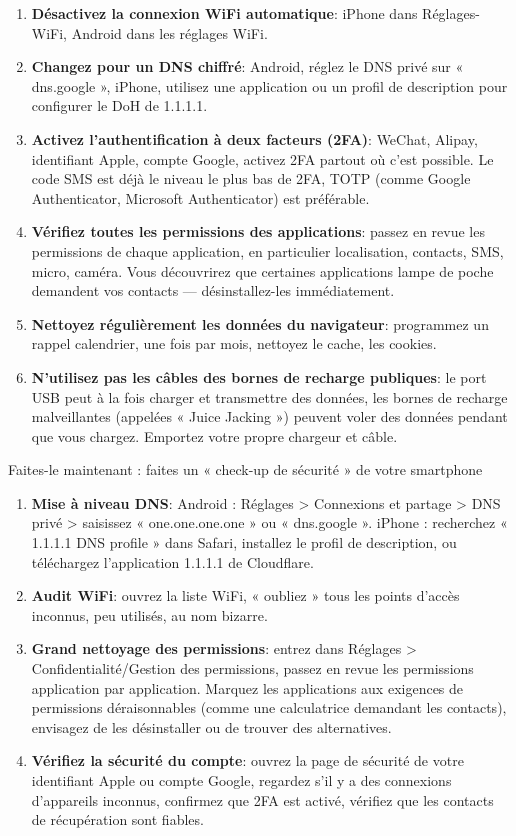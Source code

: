 \begin{enumerate}
  \item \textbf{Désactivez la connexion WiFi automatique}: iPhone dans Réglages-WiFi, Android dans les réglages WiFi.
  \item \textbf{Changez pour un DNS chiffré}: Android, réglez le DNS privé sur « dns.google », iPhone, utilisez une application ou un profil de description pour configurer le DoH de 1.1.1.1.
  \item \textbf{Activez l'authentification à deux facteurs (2FA)}: WeChat, Alipay, identifiant Apple, compte Google, activez 2FA partout où c'est possible. Le code SMS est déjà le niveau le plus bas de 2FA, TOTP (comme Google Authenticator, Microsoft Authenticator) est préférable.
  \item \textbf{Vérifiez toutes les permissions des applications}: passez en revue les permissions de chaque application, en particulier localisation, contacts, SMS, micro, caméra. Vous découvrirez que certaines applications lampe de poche demandent vos contacts — désinstallez-les immédiatement.
  \item \textbf{Nettoyez régulièrement les données du navigateur}: programmez un rappel calendrier, une fois par mois, nettoyez le cache, les cookies.
  \item \textbf{N'utilisez pas les câbles des bornes de recharge publiques}: le port USB peut à la fois charger et transmettre des données, les bornes de recharge malveillantes (appelées « Juice Jacking ») peuvent voler des données pendant que vous chargez. Emportez votre propre chargeur et câble.
\end{enumerate}

\begin{tcbpractice}{Faites-le maintenant : faites un « check-up de sécurité » de votre smartphone}
\begin{enumerate}
  \item \textbf{Mise à niveau DNS}: Android : Réglages > Connexions et partage > DNS privé > saisissez « one.one.one.one » ou « dns.google ». iPhone : recherchez « 1.1.1.1 DNS profile » dans Safari, installez le profil de description, ou téléchargez l'application 1.1.1.1 de Cloudflare.
  \item \textbf{Audit WiFi}: ouvrez la liste WiFi, « oubliez » tous les points d'accès inconnus, peu utilisés, au nom bizarre.
  \item \textbf{Grand nettoyage des permissions}: entrez dans Réglages > Confidentialité/Gestion des permissions, passez en revue les permissions application par application. Marquez les applications aux exigences de permissions déraisonnables (comme une calculatrice demandant les contacts), envisagez de les désinstaller ou de trouver des alternatives.
  \item \textbf{Vérifiez la sécurité du compte}: ouvrez la page de sécurité de votre identifiant Apple ou compte Google, regardez s'il y a des connexions d'appareils inconnus, confirmez que 2FA est activé, vérifiez que les contacts de récupération sont fiables.
\end{enumerate}

\end{tcbpractice}
